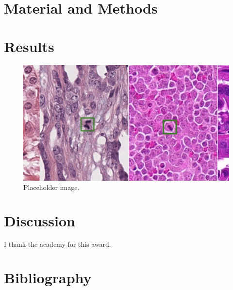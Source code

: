 \documentclass[times, twoside, watermark]{zHenriquesLab-StyleBioRxiv}
\begin{document}
\lipsum[2-5]

\section*{Material and Methods}

\lipsum[2-7]


\section*{Results}

\lipsum[2-2]

\begin{figure}%
\centering
\includegraphics[width=\linewidth]{Figures/mitosis}
\caption{Placeholder image.}
\label{fig:computerNo}
\end{figure}

\lipsum[20]


\section*{Discussion}

\lipsum[20]

\begin{acknowledgements}
I thank the academy for this award.
\end{acknowledgements}

\section*{Bibliography}

\end{document}
